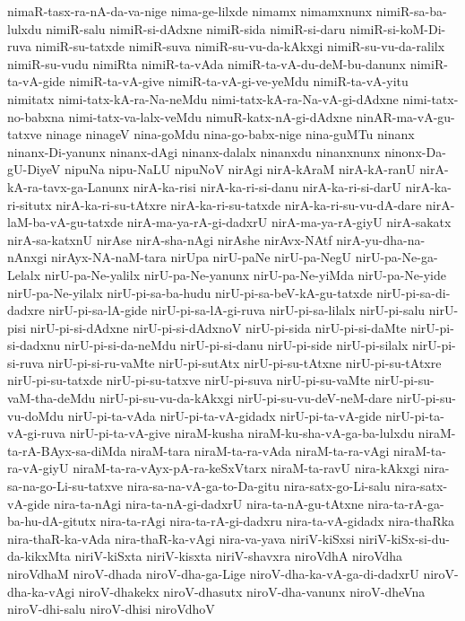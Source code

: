 {nimaR-tasx-ra-nA-da-va-nige
nima-ge-lilxde
nimamx
nimamxnunx
nimiR-sa-ba-lulxdu
nimiR-salu
nimiR-si-dAdxne
nimiR-sida
nimiR-si-daru
nimiR-si-koM-Di-ruva
nimiR-su-tatxde
nimiR-suva
nimiR-su-vu-da-kAkxgi
nimiR-su-vu-da-ralilx
nimiR-su-vudu
nimiRta
nimiR-ta-vAda
nimiR-ta-vA-du-deM-bu-danunx
nimiR-ta-vA-gide
nimiR-ta-vA-give
nimiR-ta-vA-gi-ve-yeMdu
nimiR-ta-vA-yitu
nimitatx
nimi-tatx-kA-ra-Na-neMdu
nimi-tatx-kA-ra-Na-vA-gi-dAdxne
nimi-tatx-no-babxna
nimi-tatx-va-lalx-veMdu
nimuR-katx-nA-gi-dAdxne
ninAR-ma-vA-gu-tatxve
ninage
ninageV
nina-goMdu
nina-go-babx-nige
nina-guMTu
ninanx
ninanx-Di-yanunx
ninanx-dAgi
ninanx-dalalx
ninanxdu
ninanxnunx
ninonx-Da-gU-DiyeV
nipuNa
nipu-NaLU
nipuNoV
nirAgi
nirA-kAraM
nirA-kA-ranU
nirA-kA-ra-tavx-ga-Lanunx
nirA-ka-risi
nirA-ka-ri-si-danu
nirA-ka-ri-si-darU
nirA-ka-ri-situtx
nirA-ka-ri-su-tAtxre
nirA-ka-ri-su-tatxde
nirA-ka-ri-su-vu-dA-dare
nirA-laM-ba-vA-gu-tatxde
nirA-ma-ya-rA-gi-dadxrU
nirA-ma-ya-rA-giyU
nirA-sakatx
nirA-sa-katxnU
nirAse
nirA-sha-nAgi
nirAshe
nirAvx-NAtf
nirA-yu-dha-na-nAnxgi
nirAyx-NA-naM-tara
nirUpa
nirU-paNe
nirU-pa-NegU
nirU-pa-Ne-ga-Lelalx
nirU-pa-Ne-yalilx
nirU-pa-Ne-yanunx
nirU-pa-Ne-yiMda
nirU-pa-Ne-yide
nirU-pa-Ne-yilalx
nirU-pi-sa-ba-hudu
nirU-pi-sa-beV-kA-gu-tatxde
nirU-pi-sa-di-dadxre
nirU-pi-sa-lA-gide
nirU-pi-sa-lA-gi-ruva
nirU-pi-sa-lilalx
nirU-pi-salu
nirU-pisi
nirU-pi-si-dAdxne
nirU-pi-si-dAdxnoV
nirU-pi-sida
nirU-pi-si-daMte
nirU-pi-si-dadxnu
nirU-pi-si-da-neMdu
nirU-pi-si-danu
nirU-pi-side
nirU-pi-silalx
nirU-pi-si-ruva
nirU-pi-si-ru-vaMte
nirU-pi-sutAtx
nirU-pi-su-tAtxne
nirU-pi-su-tAtxre
nirU-pi-su-tatxde
nirU-pi-su-tatxve
nirU-pi-suva
nirU-pi-su-vaMte
nirU-pi-su-vaM-tha-deMdu
nirU-pi-su-vu-da-kAkxgi
nirU-pi-su-vu-deV-neM-dare
nirU-pi-su-vu-doMdu
nirU-pi-ta-vAda
nirU-pi-ta-vA-gidadx
nirU-pi-ta-vA-gide
nirU-pi-ta-vA-gi-ruva
nirU-pi-ta-vA-give
niraM-kusha
niraM-ku-sha-vA-ga-ba-lulxdu
niraM-ta-rA-BAyx-sa-diMda
niraM-tara
niraM-ta-ra-vAda
niraM-ta-ra-vAgi
niraM-ta-ra-vA-giyU
niraM-ta-ra-vAyx-pA-ra-keSxVtarx
niraM-ta-ravU
nira-kAkxgi
nira-sa-na-go-Li-su-tatxve
nira-sa-na-vA-ga-to-Da-gitu
nira-satx-go-Li-salu
nira-satx-vA-gide
nira-ta-nAgi
nira-ta-nA-gi-dadxrU
nira-ta-nA-gu-tAtxne
nira-ta-rA-ga-ba-hu-dA-gitutx
nira-ta-rAgi
nira-ta-rA-gi-dadxru
nira-ta-vA-gidadx
nira-thaRka
nira-thaR-ka-vAda
nira-thaR-ka-vAgi
nira-va-yava
niriV-kiSxsi
niriV-kiSx-si-du-da-kikxMta
niriV-kiSxta
niriV-kisxta
niriV-shavxra
niroVdhA
niroVdha
niroVdhaM
niroV-dhada
niroV-dha-ga-Lige
niroV-dha-ka-vA-ga-di-dadxrU
niroV-dha-ka-vAgi
niroV-dhakekx
niroV-dhasutx
niroV-dha-vanunx
niroV-dheVna
niroV-dhi-salu
niroV-dhisi
niroVdhoV
}
